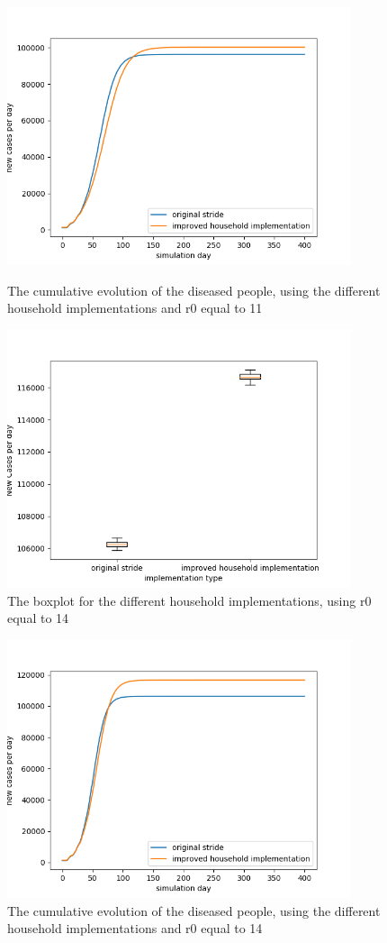 \documentclass[runningheads]{llncs}
\begin{document}
	\begin{figure}
		\centering
		\includegraphics[width=0.9\textwidth]{household_r11_cumul.png}
		\caption{The cumulative evolution of the diseased people, using the different household implementations and r0 equal to 11}	
		\label{fig10}
		\includegraphics[width=0.9\textwidth]{household_r14_boxplot.png}	
		\caption{The boxplot for the different household implementations, using r0 equal to 14}
		\label{fig11}
	\end{figure}
	\begin{figure}
		\centering
		\centering
		\includegraphics[width=0.9\textwidth]{household_r14_cumul.png}
		\caption{The cumulative evolution of the diseased people, using the different household implementations and r0 equal to 14}	
		\label{fig12}
	\end{figure}
\end{document}
